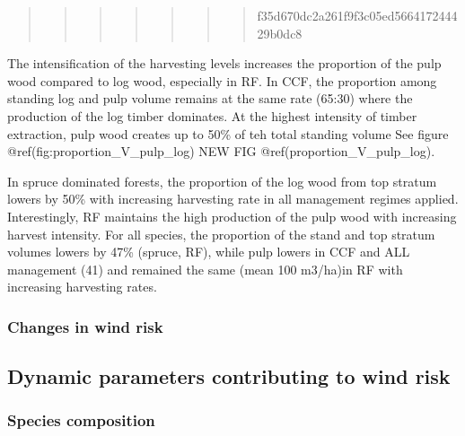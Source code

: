 \documentclass[]{elsarticle} %
\begin{document}
\begin{quote}
\begin{quote}
\begin{quote}
\begin{quote}
\begin{quote}
\begin{quote}
\begin{quote}
f35d670dc2a261f9f3c05ed566417244429b0dc8
\end{quote}
\end{quote}
\end{quote}
\end{quote}
\end{quote}
\end{quote}
\end{quote}

The intensification of the harvesting levels increases the proportion of the pulp wood compared to log wood, especially in RF. In CCF, the proportion among standing log and pulp volume remains at the same rate (65:30) where the production of the log timber dominates. At the highest intensity of timber extraction, pulp wood creates up to 50\% of teh total standing volume See figure @ref(fig:proportion\_V\_pulp\_log) NEW FIG @ref(proportion\_V\_pulp\_log).

In spruce dominated forests, the proportion of the log wood from top stratum lowers by 50\% with increasing harvesting rate in all management regimes applied. Interestingly, RF maintains the high production of the pulp wood with increasing harvest intensity. For all species, the proportion of the stand and top stratum volumes lowers by 47\% (spruce, RF), while pulp lowers in CCF and ALL management (41) and remained the same (mean 100 m3/ha)in RF with increasing harvesting rates.

\hypertarget{changes-in-wind-risk}{%
\subsubsection{Changes in wind risk}\label{changes-in-wind-risk}}

\hypertarget{dynamic-parameters-contributing-to-wind-risk}{%
\subsection{Dynamic parameters contributing to wind risk}\label{dynamic-parameters-contributing-to-wind-risk}}

\hypertarget{species-composition}{%
\subsubsection{Species composition}\label{species-composition}}
\end{document}
